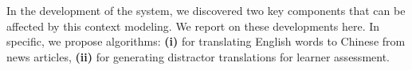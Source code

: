 In the development of the system, we discovered two key components
that can be affected by this context modeling.  We report on these
developments here.  In specific, we propose algorithms: \textbf{(i)}
for translating English words to Chinese from news articles,
\textbf{(ii)} for generating distractor translations for learner
assessment.


